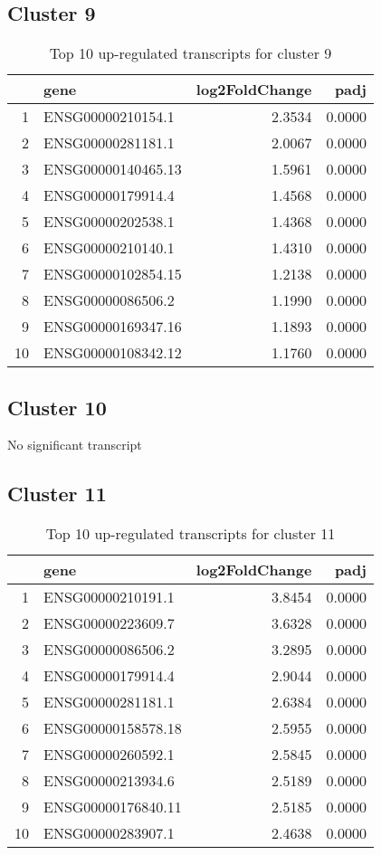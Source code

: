 \documentclass{article}
\begin{document}
\subsection{Cluster 9 }
\begin{table}[H]
\centering
\begin{tabularx}{\textwidth}{rlrr}
  \hline
 & gene & log2FoldChange & padj \\ 
  \hline
1 & ENSG00000210154.1 & 2.3534 & 0.0000 \\ 
  2 & ENSG00000281181.1 & 2.0067 & 0.0000 \\ 
  3 & ENSG00000140465.13 & 1.5961 & 0.0000 \\ 
  4 & ENSG00000179914.4 & 1.4568 & 0.0000 \\ 
  5 & ENSG00000202538.1 & 1.4368 & 0.0000 \\ 
  6 & ENSG00000210140.1 & 1.4310 & 0.0000 \\ 
  7 & ENSG00000102854.15 & 1.2138 & 0.0000 \\ 
  8 & ENSG00000086506.2 & 1.1990 & 0.0000 \\ 
  9 & ENSG00000169347.16 & 1.1893 & 0.0000 \\ 
  10 & ENSG00000108342.12 & 1.1760 & 0.0000 \\ 
   \hline
\end{tabularx}
\caption{Top 10 up-regulated transcripts for cluster 9} 
\label{tab:q3_1_9}
\end{table}
\subsection{Cluster 10 }
No significant transcript
\subsection{Cluster 11 }
\begin{table}[H]
\centering
\begin{tabularx}{\textwidth}{rlrr}
  \hline
 & gene & log2FoldChange & padj \\ 
  \hline
1 & ENSG00000210191.1 & 3.8454 & 0.0000 \\ 
  2 & ENSG00000223609.7 & 3.6328 & 0.0000 \\ 
  3 & ENSG00000086506.2 & 3.2895 & 0.0000 \\ 
  4 & ENSG00000179914.4 & 2.9044 & 0.0000 \\ 
  5 & ENSG00000281181.1 & 2.6384 & 0.0000 \\ 
  6 & ENSG00000158578.18 & 2.5955 & 0.0000 \\ 
  7 & ENSG00000260592.1 & 2.5845 & 0.0000 \\ 
  8 & ENSG00000213934.6 & 2.5189 & 0.0000 \\ 
  9 & ENSG00000176840.11 & 2.5185 & 0.0000 \\ 
  10 & ENSG00000283907.1 & 2.4638 & 0.0000 \\ 
   \hline
\end{tabularx}
\caption{Top 10 up-regulated transcripts for cluster 11} 
\label{tab:q3_1_11}
\end{table}
\end{document}
